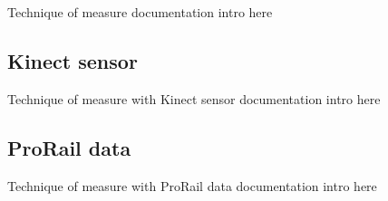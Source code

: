 \documentclass[class=article, crop=false]{standalone}
\begin{document}
Technique of measure documentation intro here

\subsection{Kinect sensor}
Technique of measure with Kinect sensor documentation intro here

\subsection{ProRail data}
Technique of measure with ProRail data documentation intro here
\end{document}
